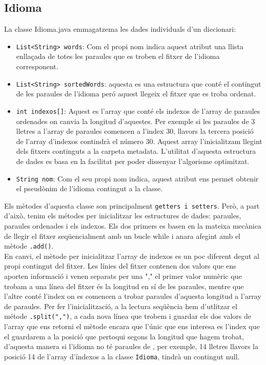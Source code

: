 \documentclass[conference]{IEEEtran}
\begin{document}
\subsection{Idioma}
La classe Idioma.java emmagatzema les dades individuals d'un diccionari:

    \begin{itemize}
        \item \texttt{List<String> words}: Com el propi nom indica aquest atribut una llista enllaçada de totes les paraules que es troben el fitxer de l'idioma corresponent.
        \item \texttt{List<String> sortedWords}: aquesta es una estructura que conté el contingut de les paraules de l'idioma peró aquest llegeix el fitxer que es troba ordenat.
        \item \texttt{int indexos[]}: Aquest es l'array que conté els indexos de l'array de paraules ordenades on canvia la longitud d'aquestes. Per exemple si les paraules de 3 lletres a l'array de paraules comencen a l'index 30, llavors la tercera posició de l'array d'indexos contindrà el número 30. Aquest array l'inicialitzam llegint dels fitxers continguts a la carpeta metadata. L'utilitat d'aquesta estructura de dades es basa en la facilitat per poder dissenyar l'algorisme optimitzat.
        \item \texttt{String nom}: Com el seu propi nom indica, aquest atribut ens permet obtenir el pseudònim de l'idioma contingut a la classe.


    \end{itemize}
Els mètodes d'aquesta classe son principalment \texttt{getters i setters}. Però, a part d'això, tenim els métodes per inicialitzar les estructures de dades: paraules, paraules ordenades i els indexos.
Els dos primers es basen en la mateixa mecànica de llegir el fitxer seqüencialment amb un bucle while i anara afegint amb el mètode \texttt{.add()}.\\
En canvi, el mètode per inicialitzar l'array de indexos es un poc diferent degut al propi contingut del fitxer. Les línies del fitxer contenen dos valors que ens aporten informació i venen separats per una "," el primer valor numèric que trobam a una línea del fitxer és la longitud en sí de les paraules, mentre que l'altre conté l'index on es comencen a trobar paraules d'aquesta longitud a l'array de paraules. Per fer l'inicialització, a la lectura seqüència hem d'utlitzar el métode \texttt{.split(",")}, a cada nova línea que trobem i guardar els dos valors de l'array que ens retorni el mètode encara que l'únic que ens interesa es l'index que el guardarem a la posició que pertoqui segons la longitud que hagem trobat, d'aquesta manera si l'idioma no té paraules de , per exemple, 14 lletres llavors la posició 14 de l'array d'índexos a la classe \texttt{Idioma}, tindrà un contingut null.
\end{document}
